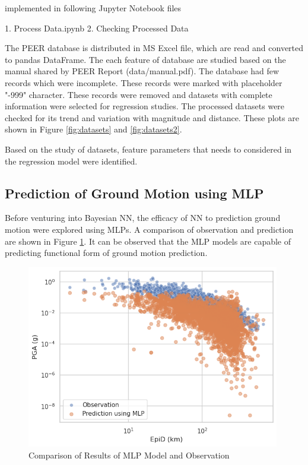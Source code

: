 \documentclass[a4paper,10pt]{article}
\begin{document}
\begin{verbatim*}
implemented in following Jupyter Notebook files

1. Process Data.ipynb
2. Checking Processed Data
\end{verbatim*}

The PEER database is distributed in MS Excel file, which are read and converted to pandas DataFrame. The each feature of database are studied based on the manual shared by PEER Report (data/manual.pdf). The database had few records which were incomplete. These records were marked with placeholder "-999" character. These records were removed and datasets with complete information were selected for regression studies. The processed datasets were checked for its trend and variation with magnitude and distance. These plots are shown in Figure \ref{fig:datasets} and \ref{fig:datasets2}.


Based on the study of datasets, feature parameters that needs to considered in the regression model were identified.

\subsection{Prediction of Ground Motion using MLP}

Before venturing into Bayesian NN, the efficacy of NN to prediction ground motion were explored using MLPs. A comparison of observation and prediction are shown in Figure \ref{MLP}. It can be observed that the MLP models are capable of predicting functional form of ground motion prediction.

\begin{figure}[h]
\centering
\includegraphics[height=8cm]{PGA_Pred}
\caption{Comparison of Results of MLP Model and Observation}
\label{MLP}
\end{figure}
\end{document}
